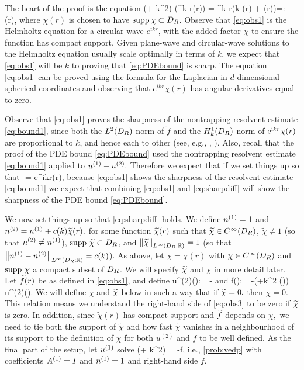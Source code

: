 The heart of the proof is the equation
\beq\label{eq:obs1}
(\Delta + k^2) \big(\re^{\ri k r}\chi(r)\big) =  \re^{\ri k r}\left(\ri k  \chi(r) + \Delta \chi(r)\right)=: -(r),
\eeq
where $\chi(r)$ is chosen to have $\operatorname{supp} \chi \subset D_{R}$. Observe that \cref{eq:obs1} is the Helmholtz equation for a circular wave $e^{ikr}$, with the added factor $\chi$ to ensure the function has compact support. Given plane-wave and circular-wave solutions to the Helmholtz equation usually scale optimally in terms of $k$, we expect that \cref{eq:obs1} will be $k$ to proving that \cref{eq:PDEbound} is sharp. The equation \cref{eq:obs1} can be proved using the formula for the Laplacian in $d$-dimensional spherical coordinates and observing that $e^{ikr} \chi(r)$ has angular derivatives equal to zero.

Observe that \cref{eq:obs1} proves the sharpness of the nontrapping resolvent estimate \cref{eq:bound1}, since both the $L^2(D_{R})$ norm of $\widetilde{f}$ and the $\HokDR$ norm of $\mathrm{e}^{\mathrm{i} kr}\chi(r)$ are proportional to $k$, and hence each to other (see, e.g., \cite[Lemma 3.10]{ChMo:08},  \cite[Lemma 4.12]{Sp:14}). Also, recall that the proof of the PDE bound \cref{eq:PDEbound} used the nontrapping resolvent estimate \cref{eq:bound1} applied to ${u}^{(1)}-{u}^{(2)}.$ Therefore we expect that if we set things up so that
\beq\label{eq:sharpdiff}
\uso-\ust = e^{ikr}\chi(r),
\eeq
because \cref{eq:obs1} shows the sharpness of the resolvent estimate \cref{eq:bound1} we expect that combining \cref{eq:obs1} and \cref{eq:sharpdiff} will show the sharpness of the PDE bound \cref{eq:PDEbound}.

We now set things up so that \cref{eq:sharpdiff} holds. We define ${n}^{(1)} = 1$ and ${n}^{(2)} = {n}^{(1)} + c(k) \widetilde{\chi}(r),$ for some function $\widetilde{\chi}(r)$ such that $\widetilde{\chi}\in C^{\infty}(D_{R})$, $\widetilde{\chi}\not = 1$ (so that ${n}^{(2)}\not = {n}^{(1)}$), $\operatorname{supp} \, \widetilde{\chi} \subset D_{R}$, and $\NLiDRRR{\chitilde} = 1$ (so that $\NLiDRRR{\nso-\nst} = c(k)$).   As above, let $\chi=\chi(r)$ with $\chi \in C^{\infty}(D_{R})$ and $\operatorname{supp} \,\chi$ a compact subset of $D_{R}$. We will specify $\widetilde{\chi}$ and $\chi$ in more detail later. Let $\widetilde{f}(r)$ be as defined in \cref{eq:obs1}, and define
\beq\label{eq:obs3}
u^{(2)}(\bx):= -
\eeq
and
\beqs
f(\bx):= -\big(\Delta +k^2 \nst(\bx)\big) u^{(2)}(\bx).
\eeqs
We will define $\chi$ and $\widetilde{\chi}$ below in such a way that if $\widetilde{\chi}=0,$ then $\chi = 0$. This relation means we understand the right-hand side of \cref{eq:obs3} to be zero if $\widetilde{\chi}$ is zero. In addition, since $\widetilde{\chi}(r)$ has compact support and $\widetilde{f}$ depends on $\chi,$ we need to tie both the support of $\widetilde{\chi}$ and how fast $\widetilde{\chi}$ vanishes in a neighbourhood of its support to the definition of $\chi$ for both $u^{(2)}$ and $f$ to be well defined. As the final part of the setup, let ${u}^{(1)}$ solve
\beqs
\mleft(\Delta + k^2\mright) \uso = -f,
\eeqs
i.e., \cref{prob:vedp} with coefficients ${A}^{(1)} = I$ and ${n}^{(1)} =1$ and right-hand side $f$.


